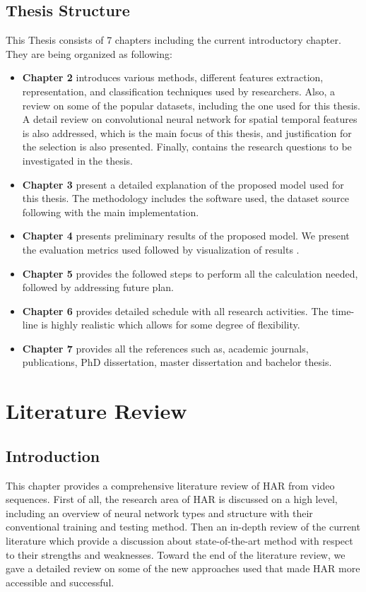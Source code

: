 \section{Thesis Structure}
\hspace{5mm} This Thesis consists of 7 chapters including the current introductory chapter. They are being organized as following:\\
\begin{itemize}
\item \textbf{Chapter 2} introduces various methods, different features extraction, representation, and classification techniques used by researchers. Also, a review on some of the popular datasets, including the one used for this thesis. A detail review on convolutional neural network for spatial temporal features is also addressed, which is the main focus of this thesis, and justification for the selection is also presented. Finally, contains the research questions to be investigated in the thesis.
\item \textbf{Chapter 3} present a detailed explanation of the proposed model used for this thesis. The methodology includes the software used, the dataset source following with the main implementation.
\item \textbf{Chapter 4} presents preliminary results of the proposed model. We present the evaluation metrics used followed by visualization of results .
\item \textbf{Chapter 5} provides the followed steps to perform all the calculation needed, followed by addressing future plan. 
\item \textbf{Chapter 6} provides detailed schedule with all research activities. The time-line is highly realistic which allows for some degree of flexibility.
\item \textbf{Chapter 7} provides all the references such as, academic journals, publications, PhD dissertation, master dissertation and bachelor thesis.
\end{itemize}

\chapter{Literature Review}


\section{Introduction}
\hspace{5mm} This chapter provides a comprehensive literature review of HAR from video sequences. First of all, the research area of HAR is discussed on a high level, including an overview of neural network types and structure with their conventional training and testing method. Then an in-depth review of the current literature which provide a discussion about state-of-the-art method with respect to their strengths and weaknesses. Toward the end of the literature review, we gave a detailed review on some of the new approaches used that made HAR more accessible and successful.

